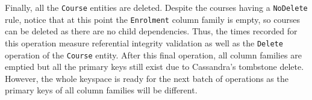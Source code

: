 Finally,  all the \texttt{Course} entities are deleted.  Despite the courses
having a \texttt{NoDelete} rule,  notice that at this point the
\texttt{Enrolment} column family is empty,  so courses can be deleted as there
are no child dependencies.  Thus,  the times recorded for this operation measure
referential integrity validation as well as the \texttt{Delete} operation
of the \texttt{Course} entity.  After this final operation,  all column families
are emptied but all the primary keys still exist due to Cassandra's tombstone
delete.  However,  the whole keyspace is ready for the next batch of operations as
the primary keys of all column families will be different. 
	
	